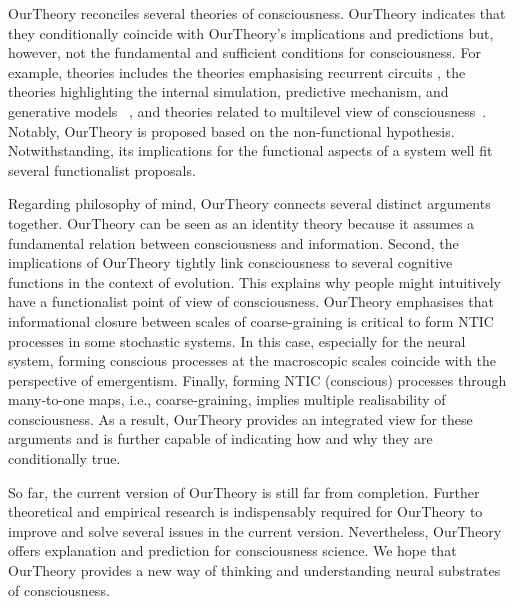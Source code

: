 \documentclass[utf8]{article}
\begin{document}
    
    \ac{OurTheory} reconciles several theories of consciousness. \ac{OurTheory} indicates that they conditionally coincide with \ac{OurTheory}'s implications and predictions but, however, not the fundamental and sufficient conditions for consciousness. For example, theories includes the theories emphasising recurrent circuits \citep{lamme2006towards, edelman1992bright}, the theories highlighting the internal simulation,  predictive mechanism, and generative models ~\citep{revonsuo2006inner, clark_2013,Hohwy2013, kanai_chang_yu_de_abril_biehl_guttenberg_2019, seth2014predictive, seth2015presence}, and theories related to multilevel view of consciousness~\citep{pennartz2018consciousness,pennartz2015brain,prinz2007intermediate, jackendoff1987consciousness}. Notably, \ac{OurTheory} is proposed based on the non-functional hypothesis. Notwithstanding, its implications for the functional aspects of a system well fit several functionalist proposals.
	
	
	Regarding philosophy of mind, \ac{OurTheory} connects several distinct arguments together. \ac{OurTheory} can be seen as an identity theory because it assumes a fundamental relation between consciousness and information. Second, the implications of \ac{OurTheory} tightly link consciousness to several cognitive functions in the context of evolution. This explains why people might intuitively have a functionalist point of view of consciousness. \ac{OurTheory} emphasises that informational closure between scales of coarse-graining is critical to form NTIC processes in some stochastic systems. In this case, especially for the neural system, forming conscious processes at the macroscopic scales coincide with the perspective of emergentism. Finally, forming NTIC (conscious) processes through many-to-one maps, i.e., coarse-graining, implies multiple realisability of consciousness. As a result, \ac{OurTheory} provides an integrated view for these arguments and is further capable of indicating how and why they are conditionally true.
	
	So far, the current version of \ac{OurTheory} is still far from completion. Further theoretical and empirical research is indispensably required for \ac{OurTheory} to improve and solve several issues in the current version. Nevertheless, \ac{OurTheory} offers explanation and prediction for consciousness science. We hope that \ac{OurTheory} provides a new way of thinking and understanding neural substrates of consciousness.  
	
\end{document}
